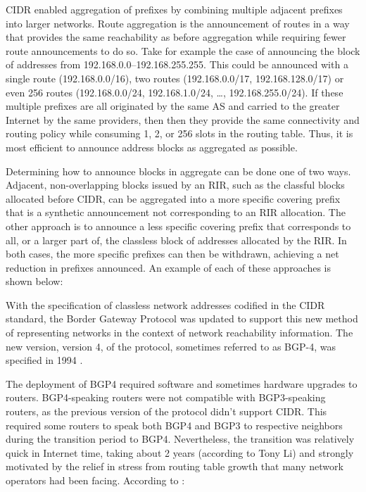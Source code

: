 
CIDR enabled aggregation of prefixes by combining multiple adjacent prefixes into larger networks. Route aggregation is the announcement of routes in a way that provides the same reachability as before aggregation while requiring fewer route announcements to do so. Take for example the case of announcing the block of addresses from 192.168.0.0--192.168.255.255. This could be announced with a single route (192.168.0.0/16), two routes (192.168.0.0/17, 192.168.128.0/17) or even 256 routes (192.168.0.0/24, 192.168.1.0/24, \ldots, 192.168.255.0/24). If these multiple prefixes are all originated by the same AS and carried to the greater Internet by the same providers, then then they provide the same connectivity and routing policy while consuming 1, 2, or 256 slots in the routing table. Thus, it is most efficient to announce address blocks as aggregated as possible.


Determining how to announce blocks in aggregate can be done one of two ways. Adjacent, non-overlapping blocks issued by an RIR, such as the classful blocks allocated before CIDR, can be aggregated into a more specific covering prefix that is a synthetic announcement not corresponding to an RIR allocation. The other approach is to announce a less specific covering prefix that corresponds to all, or a larger part of, the classless block of addresses allocated by the RIR. In both cases, the more specific prefixes can then be withdrawn, achieving a net reduction in prefixes announced. An example of each of these approaches is shown below:


With the specification of classless network addresses codified in the CIDR standard, the Border Gateway Protocol was updated to support this new method of representing networks in the context of network reachability information. The new version, version 4, of the protocol, sometimes referred to as BGP-4, was specified in 1994 \cite{rfc1654}.

The deployment of BGP4 required software and sometimes hardware upgrades to routers. BGP4-speaking routers were not compatible with BGP3-speaking routers, as the previous version of the protocol didn't support CIDR. This required some routers to speak both BGP4 and BGP3 to respective neighbors during the transition period to BGP4. Nevertheless, the transition was relatively quick in Internet time, taking about 2 years (according to Tony Li) and strongly motivated by the relief in stress from routing table growth that many network operators had been facing. According to \cite{rfc1773}:

